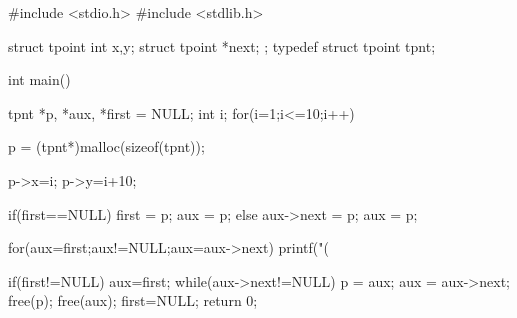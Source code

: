\documentclass[ ]{article}
\begin{document}
	\begin{mylist}
#include <stdio.h>
#include <stdlib.h>

struct tpoint{
	int x,y;
	struct tpoint *next;
};
typedef struct tpoint tpnt;

int main(){
	tpnt *p, *aux, *first = NULL;
	int i;
	for(i=1;i<=10;i++){
		p = (tpnt*)malloc(sizeof(tpnt));
		
		p->x=i;
		p->y=i+10;
		
		if(first==NULL){
			first = p;
			aux = p;
		}
		else{
			aux->next = p;
			aux = p;
		}
	}
	
	for(aux=first;aux!=NULL;aux=aux->next){
		printf("(%
	}
	
	if(first!=NULL){
		aux=first;
		while(aux->next!=NULL){
			p = aux;
			aux = aux->next;
			free(p);
		}
		free(aux);
		first=NULL;
	}
	return 0;
}
	\end{mylist}
\end{document}
